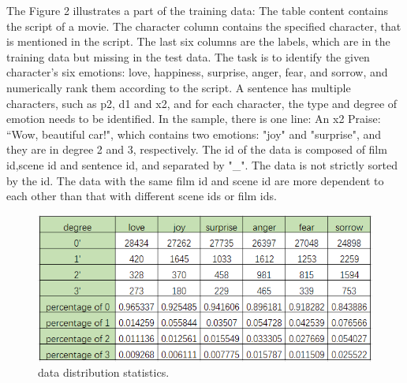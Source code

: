 \documentclass[12pt,twocolumn,letterpaper]{article}
\begin{document}
The Figure 2 illustrates a part of the training data: The table content contains the script of a movie. The character column contains the specified character, that is mentioned in the script. The last six columns are the labels, which are in the training data but missing in the test data. The task is to identify the given character’s six emotions: love, happiness, surprise, anger, fear, and sorrow, and numerically rank them according to the script. A sentence has multiple characters, such as p2, d1 and x2, and for each character, the type and degree of emotion needs to be identified. In the sample, there is one line: An x2 Praise: “Wow, beautiful car!", which contains two emotions: "joy" and "surprise", and they are in degree 2 and 3, respectively. The id of the data is composed of film id,scene id and sentence id, and separated by "\_". The data is not strictly sorted by the id. The data with the same film id and scene id are more dependent to each other than that with different scene ids or film ids.
\begin{figure}
\begin{center}
\includegraphics[scale=0.7]{data distribution.png}
\end{center}
   \caption{data distribution statistics.}
\label{fig:short}
\end{figure}
\end{document}
